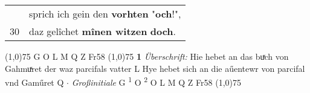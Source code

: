 \documentclass[8pt,a4paper,notitlepage]{article}
\begin{document}
\begin{table}[ht]
\begin{minipage}[t]{0.5\linewidth}
\begin{tabular}{rl}
 & sprich ich gein den \textbf{vorhten} "\textbf{och}!",\\ 
30 & daz gelîchet \textbf{mînen witzen} \textbf{doch}.\\ 
\end{tabular}
\scriptsize
\line(1,0){75} \newline
G O L M Q Z Fr58 \newline
\line(1,0){75} \newline
\textbf{1} \textit{Überschrift:} Hie hebet an das buͯch von Gahmuͯret der waz parcifals vatter L  Hye hebet sich an die aűentewr von parcifal vnd Gaműret Q   $\cdot$ \textit{Großinitiale} G  \textsuperscript{1}\hspace{-1.3mm} O  \textsuperscript{2}\hspace{-1.3mm} O L M Q Z Fr58  \newline
\line(1,0){75} \newline

\end{minipage}
\end{table}
\end{document}
